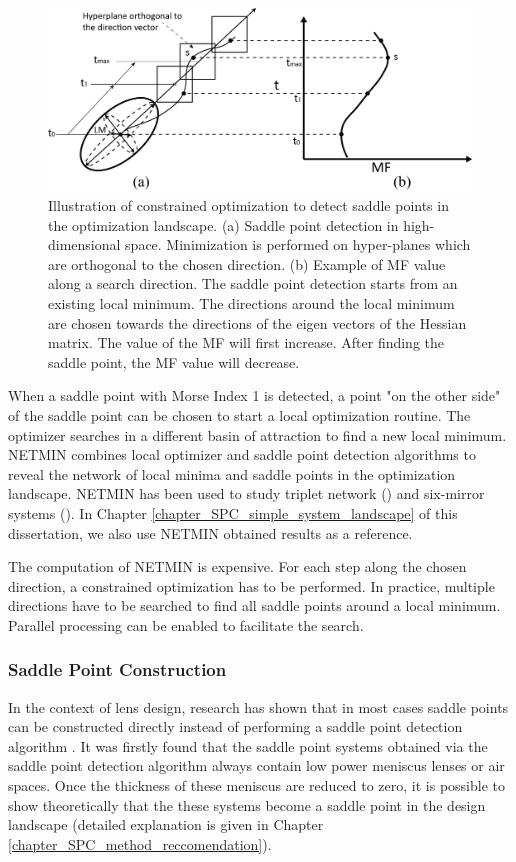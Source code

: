 \begin{figure}
    \centering
    \includegraphics[scale=0.58]{chapter-1/figures/spd_plot.png}
    \caption{Illustration of constrained optimization to detect saddle points in the optimization landscape. (a) Saddle point detection in high-dimensional space. Minimization is performed on hyper-planes which are orthogonal to the chosen direction. (b) Example of MF value along a search direction. The saddle point detection starts from an existing local minimum. The directions around the local minimum are chosen towards the directions of the eigen vectors of the Hessian matrix. The value of the MF will first increase. After finding the saddle point, the MF value will decrease. }
    \label{fig: spd_illustration}
\end{figure} 

When a saddle point with Morse Index 1 is detected, a point "on the other side" of the saddle point can be chosen to start a local optimization routine. The optimizer searches in a different basin of attraction to find a new local minimum. NETMIN combines local optimizer and saddle point detection algorithms to reveal the network of local minima and saddle points in the optimization landscape. NETMIN has been used to study triplet network (\cite{PascalTriplet2009}) and six-mirror systems (\cite{MarinescuSPD07}). In Chapter \ref{chapter_SPC_simple_system_landscape} of this dissertation, we also use NETMIN obtained results as a reference. 

The computation of NETMIN is expensive. For each step along the chosen direction, a constrained optimization has to be performed. In practice, multiple directions have to be searched to find all saddle points around a local minimum. Parallel processing can be enabled to facilitate the search.  


\subsubsection{Saddle Point Construction }
In the context of lens design, research has shown that in most cases saddle points can be constructed directly instead of performing a saddle point detection algorithm \cite{vanTurnhoutThesis2009} \cite{MVTurnhoutSPC15}. It was firstly found that the saddle point systems obtained via the saddle point detection algorithm always contain low power meniscus lenses or air spaces. Once the thickness of these meniscus are reduced to zero, it is possible to show theoretically that the these systems become a saddle point in the design landscape (detailed explanation is given in Chapter \ref{chapter_SPC_method_reccomendation}).

